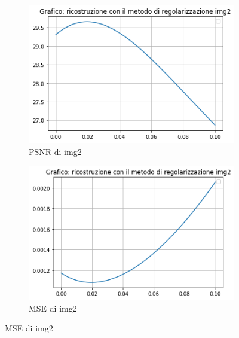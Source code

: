 \begin{figure}[H]
    \begin{subfigure}{0.5\textwidth}
        \centering
        \includegraphics[width=\textwidth]{output/PSNR/outputPSNR-img2.png}
        \caption{PSNR di img2}
        \label{fig:img2PSNR}
    \end{subfigure}\hfill
    \begin{subfigure}{0.5\textwidth}
        \centering
        \includegraphics[width=\textwidth]{output/MSE/outputMSE-img2.png}
        \caption{MSE di img2}
        \label{fig:img2MSE}
    \end{subfigure}
    

\end{figure}
